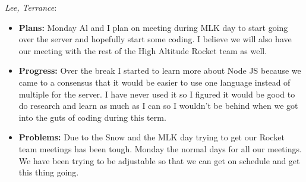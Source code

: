 \documentclass[10pt,draftclsnofoot,onecolumn]{IEEEtran}
\newcommand{\subsubsubsection}[1]{
	\hfill\break\textit{#1}:
}
\begin{document}
\subsubsubsection{Lee, Terrance}
\begin{itemize}
	\item \textbf{Plans: }
	Monday Al and I plan on meeting during MLK day to start going over the server and hopefully start some coding. I believe we will also have our meeting with the rest of the High Altitude Rocket team as well.
	\item \textbf{Progress: }
	Over the break I started to learn more about Node JS because we came to a consensus that it would be easier to use one language instead of multiple for the server. I have never used it so I figured it would be good to do research and learn as much as I can so I wouldn't be behind when we got into the guts of coding during this term.
	\item \textbf{Problems: }
	Due to the Snow and the MLK day trying to get our Rocket team meetings has been tough. Monday the normal days for all our meetings. We have been trying to be adjustable so that we can get on schedule and get this thing going.
\end{itemize}
\end{document}
